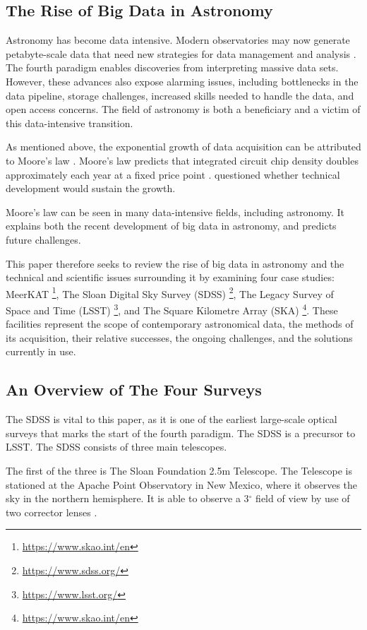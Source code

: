 \documentclass[preprint,linenumbers, longauthor]{aastex631}
\begin{document}
\subsection{The Rise of Big Data in Astronomy}
Astronomy has become data intensive. Modern observatories may now generate petabyte-scale data that need new strategies for data management and analysis \cite{heyFourthParadigmDataIntensive2009}. 
The fourth paradigm enables discoveries from interpreting massive data sets. 
However, these advances also expose alarming issues, including bottlenecks in the data pipeline, storage challenges, increased skills needed to handle the data, and open access concerns. 
The field of astronomy is both a beneficiary and a victim of this data-intensive transition. 

As mentioned above, the exponential growth of data acquisition can be attributed to Moore's law \cite{heyFourthParadigmDataIntensive2009}.  
Moore's law predicts that integrated circuit chip density doubles approximately each year at a fixed price point \cite{mooreCrammingMoreComponents2006}.
\cite{mooreCrammingMoreComponents2006} questioned whether technical development would sustain the growth.

Moore's law can be seen in many data-intensive fields, including astronomy.
It explains both the recent development of big data in astronomy, and predicts future challenges.

This paper therefore seeks to review the rise of big data in astronomy and the technical and scientific issues surrounding it by examining four case studies: MeerKAT \footnote{\url{https://www.skao.int/en}}, The Sloan Digital Sky Survey (SDSS) \footnote{\url{https://www.sdss.org/}}, The Legacy Survey of Space and Time (LSST) \footnote{\url{https://www.lsst.org/}}, and The Square Kilometre Array (SKA) \footnote{\url{https://www.skao.int/en}}. 
These facilities represent the scope of contemporary astronomical data, the methods of its acquisition, their relative successes, the ongoing challenges, and the solutions currently in use.

\subsection{An Overview of The Four Surveys}
The SDSS is vital to this paper, as it is one of the earliest large-scale optical surveys that marks the start of the fourth paradigm. 
The SDSS is a precursor to LSST. The SDSS
consists of three main telescopes.

The first of the three is The Sloan Foundation 2.5m Telescope. 
The Telescope is stationed at the Apache Point Observatory in New Mexico, where it observes the sky in the northern hemisphere. 
It is able to observe a 3$^\circ$ field of view by use of two corrector lenses \citep{gunn25TelescopeSloan2006}.
\end{document}
